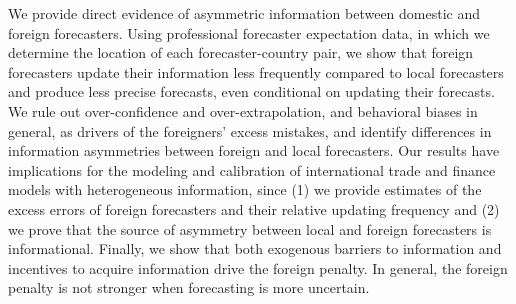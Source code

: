 

We provide direct evidence of asymmetric information between domestic and foreign forecasters. Using professional forecaster expectation data, in which we determine the location of each forecaster-country pair, we show that foreign forecasters update their information less frequently compared to local forecasters and produce less precise forecasts, even conditional on updating their forecasts. We rule out over-confidence and over-extrapolation, and behavioral biases in general, as drivers of the foreigners' excess mistakes, and identify differences in information asymmetries between foreign and local forecasters. Our results have implications for the modeling and calibration of international trade and finance models with heterogeneous information, since (1) we provide estimates of the excess errors of foreign forecasters and their relative updating frequency and (2) we prove that the source of asymmetry between local and foreign forecasters is informational. Finally, we show that both exogenous barriers to information and incentives to acquire information drive the foreign penalty. In general, the foreign penalty is not stronger when forecasting is more uncertain.


